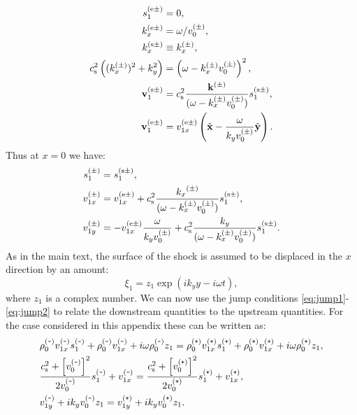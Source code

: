 \documentclass[useAMS,usenatbib]{mn2e}
\def\Plus{\texttt{+}}
\def\Minus{\texttt{-}}
\begin{document}
\begin{align}
s_1 ^{(\rm e \pm)}  & = 0, \\
k_x^{(\rm e \pm)} & = \omega / v_0^{(\pm)} ,\\
k_x^{(\rm s \pm)} & \equiv k_x^{(\pm)} , \\
 \cs^2 \left( (k_x^{(\pm)})^2 + k_y^2 \right) & =  \left( \omega -k_x^{(\pm)} v_0^{(\pm)} \right)^2 , \label{eq:dispdk1}\\
\bfv_1 ^{(\rm s \pm)} & =  \cs^2 \frac{\mathbf{k}^{(\pm)}}{ ( \omega -  k_x^{(\pm)} v_0^{(\pm)})} s_1 ^{(\rm s \pm)} , \\
\bfv_1 ^{(\rm e \pm)} & = v_{1x}^{(\rm e \pm)} \left( \hat{\mathbf{x}} - \frac{\omega}{k_y v_0^{(\pm)}} \hat{\mathbf{y}} \right) .
%
\end{align}
Thus at $x=0$ we have:
%
\begin{align}
s_1^{(\pm)} & = s_1 ^{(\rm s \pm)}, \label{eq:s1pm} \\
v_{1x}^{(\pm)} & = v_{1x}^{(\rm e \pm)} + c_{\rm s}^2 \frac{{k_x}^{(\pm)}}{ ( \omega - k_x^{(\pm)} v_0^{(\pm)})} s_1 ^{(\rm s \pm)}, \label{eq:v1xpm}  \\
v_{1y}^{(\pm)} & = - v_{1x}^{(\rm e \pm)} \frac{\omega}{k_y v_0^{(\pm)}}   + c_{\rm s}^2 \frac{{k_y}}{ ( \omega - k_x^{(\pm)} v_0^{(\pm)})} s_1 ^{(\rm s \pm)}. \label{eq:v1ypm}
\end{align}
%
As in the main text, the surface of the shock is assumed to be displaced in the $x$ direction by an amount:
\begin{equation}
\xi_1 = z_1 \exp(i k_y y - i \omega t),
\end{equation}
where $z_1$ is a complex number. We can now use the jump conditions \eqref{eq:jump1}-\eqref{eq:jump2} to relate the downstream quantities to the upstream quantities. For the case considered in this appendix these can be written as:
%
\begin{align}
& \rho_0^{(\Minus)}  v_{1x}^{(\Minus)} s_1^{(\Minus)} + \rho_0^{(\Minus)}  v_{1x}^{(\Minus)} + i \omega \rho_0^{(\Minus)}  z_1 =  \rho_0^{(\Plus)}  v_{1x}^{(\Plus)} s_1^{(\Plus)} + \rho_0^{(\Plus)}  v_{1x}^{(\Plus)} + i \omega \rho_0^{(\Plus)} z_1,  \label{eq:jumpdk1} \\
& \frac{\cs^2+\left[v_0^{(\Minus)} \right]^2}{2 v_0^{(\Minus)} }s_1^{(\Minus)} +v_{1x}^{(\Minus)} = \frac{\cs^2+\left[v_0^{(\Plus)} \right]^2}{2 v_0^{(\Plus)} }s_1^{(\Plus)} +v_{1x}^{(\Plus)}  ,\label{eq:jumpdk2} \\
& v_{1y}^{(\Minus)}+ i k_y v_{0}^{(\Minus)} z_1 =  v_{1y}^{(\Plus)}+ i k_y v_{0}^{(\Plus)} z_1. \label{eq:jumpdk3} \,
\end{align}
\end{document}
